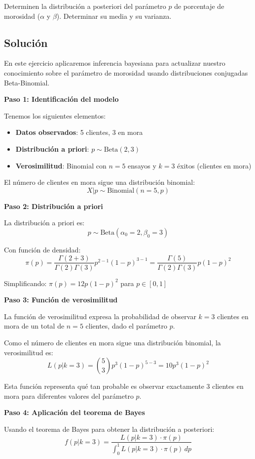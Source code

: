 \documentclass[11pt,a4paper]{article}
\begin{document}
Determinen la distribución a posteriori del parámetro $p$ de porcentaje de morosidad ($\alpha$ y $\beta$). Determinar su media y su varianza.

\subsection{Solución}

En este ejercicio aplicaremos inferencia bayesiana para actualizar nuestro conocimiento sobre el parámetro de morosidad usando distribuciones conjugadas Beta-Binomial.

\textbf{Paso 1: Identificación del modelo}

Tenemos los siguientes elementos:
\begin{itemize}
    \item \textbf{Datos observados}: 5 clientes, 3 en mora
    \item \textbf{Distribución a priori}: $p \sim \text{Beta}(2, 3)$
    \item \textbf{Verosimilitud}: Binomial con $n = 5$ ensayos y $k = 3$ éxitos (clientes en mora)
\end{itemize}

El número de clientes en mora sigue una distribución binomial:
\[
X | p \sim \text{Binomial}(n = 5, p)
\]

\textbf{Paso 2: Distribución a priori}

La distribución a priori es:
\[
p \sim \text{Beta}(\alpha_0 = 2, \beta_0 = 3)
\]

Con función de densidad:
\[
\pi(p) = \frac{\Gamma(2+3)}{\Gamma(2)\Gamma(3)} p^{2-1}(1-p)^{3-1} = \frac{\Gamma(5)}{\Gamma(2)\Gamma(3)} p(1-p)^2
\]

Simplificando: $\pi(p) = 12p(1-p)^2$ para $p \in [0,1]$

\textbf{Paso 3: Función de verosimilitud}

La función de verosimilitud expresa la probabilidad de observar $k = 3$ clientes en mora de un total de $n = 5$ clientes, dado el parámetro $p$. 

Como el número de clientes en mora sigue una distribución binomial, la verosimilitud es:
\[
L(p|k = 3) = \binom{5}{3} p^3 (1-p)^{5-3} = 10 p^3 (1-p)^2
\]

Esta función representa qué tan probable es observar exactamente 3 clientes en mora para diferentes valores del parámetro $p$.

\textbf{Paso 4: Aplicación del teorema de Bayes}

Usando el teorema de Bayes para obtener la distribución a posteriori:
\[
f(p|k = 3) = \frac{L(p|k = 3) \cdot \pi(p)}{\int_0^1 L(p|k = 3) \cdot \pi(p) \, dp}
\]
\end{document}
